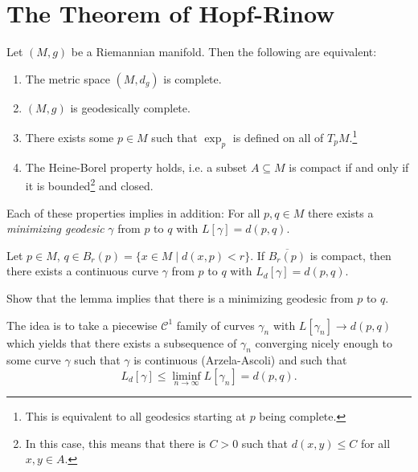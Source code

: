 \section{The Theorem of Hopf-Rinow}
\begin{theorem}
   Let $(M,g)$ be a Riemannian manifold. Then the following are equivalent:
   \begin{enumerate}
       \item The metric space $(M,d_g)$ is complete.
        \item $(M,g)$ is geodesically complete.
        \item There exists some $p \in M$ such that $\exp_p$ is defined on all of $T_pM$.\footnote{This is equivalent to all geodesics starting at $p$ being complete.}
        \item The Heine-Borel property holds, i.e. a subset $A \subseteq M$ is compact if and only if it is bounded\footnote{In this case, this means that there is $C > 0$ such that $d(x,y) \leq C$ for all $x,y \in A$.} and closed.
   \end{enumerate}
   Each of these properties implies in addition: For all $p,q \in M$ there exists a \emph{minimizing geodesic} $\gamma$ from $p$ to $q$ with $L[\gamma] = d(p,q)$.
\end{theorem}
\begin{lemma}
    Let $p \in M$, $q \in B_r(p)=\{x \in M \mid d(x,p)<r\}$. If $\overline{B_r(p)}$ is compact, then there exists a continuous curve $\gamma$ from $p$ to $q$ with $L_d[\gamma]=d(p,q)$. 
\end{lemma}
\begin{ex}
    Show that the lemma implies that there is a minimizing geodesic from $p$ to $q$.
\end{ex}
\begin{intuition}
The idea is to take a piecewise $\mathcal{C}^1$ family of curves $\gamma_n$ with $L[\gamma_n] \to d(p,q)$ which yields that there exists a subsequence of $\gamma_n$ converging nicely enough to some curve $\gamma$ such that $\gamma$ is continuous (Arzela-Ascoli) and such that \[
L_d[\gamma] \leq \liminf_{n \to \infty} L[\gamma_n]=d(p,q)
.\] 
\end{intuition}
